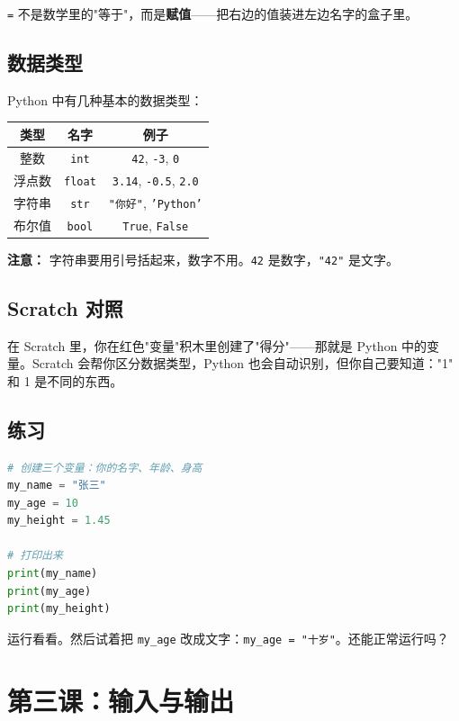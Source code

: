 \documentclass[a4paper,12pt]{ctexart}
\begin{document}
\texttt{=} 不是数学里的"等于"，而是\textbf{赋值}——把右边的值装进左边名字的盒子里。

\subsection*{数据类型}

Python 中有几种基本的数据类型：

\begin{center}
\begin{tabular}{|c|c|c|}
\hline
\textbf{类型} & \textbf{名字} & \textbf{例子} \\ \hline
整数 & \texttt{int} & \texttt{42}, \texttt{-3}, \texttt{0} \\ \hline
浮点数 & \texttt{float} & \texttt{3.14}, \texttt{-0.5}, \texttt{2.0} \\ \hline
字符串 & \texttt{str} & \texttt{"你好"}, \texttt{'Python'} \\ \hline
布尔值 & \texttt{bool} & \texttt{True}, \texttt{False} \\ \hline
\end{tabular}
\end{center}

\textbf{注意：} 字符串要用引号括起来，数字不用。\texttt{42} 是数字，\texttt{"42"} 是文字。

\subsection*{Scratch 对照}

在 Scratch 里，你在红色"变量"积木里创建了"得分"——那就是 Python 中的变量。Scratch 会帮你区分数据类型，Python 也会自动识别，但你自己要知道："1" 和 1 是不同的东西。

\subsection*{练习}

\begin{lstlisting}[language=Python]
# 创建三个变量：你的名字、年龄、身高
my_name = "张三"
my_age = 10
my_height = 1.45

# 打印出来
print(my_name)
print(my_age)
print(my_height)
\end{lstlisting}

运行看看。然后试着把 \texttt{my\_age} 改成文字：\texttt{my\_age = "十岁"}。还能正常运行吗？

\section*{第三课：输入与输出}
\end{document}
